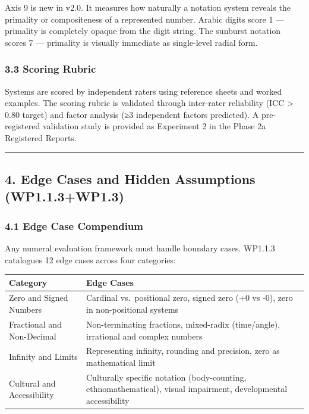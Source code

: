 \documentclass[
]{article}
\newcounter{none} %
\begin{document}
Axis 9 is new in v2.0. It measures how naturally a notation system
reveals the primality or compositeness of a represented number. Arabic
digits score 1 --- primality is completely opaque from the digit string.
The sunburst notation scores 7 --- primality is visually immediate as
single-level radial form.

\subsubsection{3.3 Scoring Rubric}\label{scoring-rubric}

Systems are scored by independent raters using reference sheets and
worked examples. The scoring rubric is validated through inter-rater
reliability (ICC \textgreater{} 0.80 target) and factor analysis (≥3
independent factors predicted). A pre-registered validation study is
provided as Experiment 2 in the Phase 2a Registered Reports.

\begin{center}\rule{0.5\linewidth}{0.5pt}\end{center}

\subsection{4. Edge Cases and Hidden Assumptions
(WP1.1.3+WP1.3)}\label{edge-cases-and-hidden-assumptions-wp1.1.3wp1.3}

\subsubsection{4.1 Edge Case Compendium}\label{edge-case-compendium}

Any numeral evaluation framework must handle boundary cases. WP1.1.3
catalogues 12 edge cases across four categories:

{\def\LTcaptype{none} %
\begin{longtable}[]{@{}
  >{\raggedright\arraybackslash}p{}
  >{\raggedright\arraybackslash}p{}@{}}
\toprule\noalign{}
\begin{minipage}[b]{\linewidth}\raggedright
Category
\end{minipage} & \begin{minipage}[b]{\linewidth}\raggedright
Edge Cases
\end{minipage} \\
\midrule\noalign{}
\endhead
\bottomrule\noalign{}
\endlastfoot
Zero and Signed Numbers & Cardinal vs.~positional zero, signed zero (+0
vs -0), zero in non-positional systems \\
Fractional and Non-Decimal & Non-terminating fractions, mixed-radix
(time/angle), irrational and complex numbers \\
Infinity and Limits & Representing infinity, rounding and precision,
zero as mathematical limit \\
Cultural and Accessibility & Culturally specific notation
(body-counting, ethnomathematical), visual impairment, developmental
accessibility \\
\end{longtable}
}
\end{document}
